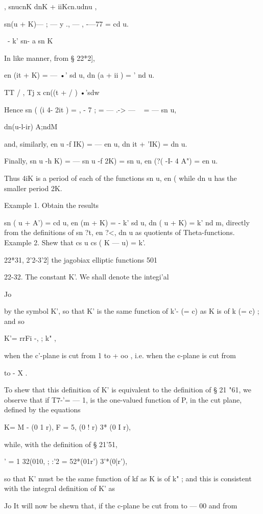  , snucnK dnK +  iiKcn.udnu , 

sn(u + K)— ; — y ., — , -—77 = cd u. 

  \ - k' sn- a sn  K 

In like manner, from § 22*2], 

en (it + K) = —  •' sd u, dn (a + ii ) =  ' nd u. 

TT / , Tj x cn((t + / )  •'sdw 

Hence sn ( (i 4- 2it ) = , -  7 ; = — .-> —  ~ = — sn u, 

  dn(u-l-ir) A;ndM 

and, similarly, en  u -f  IK) = — en u, dn  it + 'IK) = dn u. 

Finally, sn  u -h  K) = — sn  u -f 2K) = sn u, en (?( -I- 4 A") = en u. 

Thus 4iK is a period of each of the functions sn u, en (  while dn u has 
the smaller period 2K. 

Example 1. Obtain the results 

sn ( u + A') = cd u, en (m + K) = - k' sd u, dn ( u + K) = k' nd m, 
directly from the definitions of sn ?t, en ?<, dn u as quotients of Theta-functions. 
Example 2. Shew that cs u cs ( K — u) = k'. 



22*31, 2'2-3'2] the jagobiax elliptic functions 501 

22-32. The constant K'. 
We shall denote the integi'al 

Jo 

by the symbol K', so that K' is the same function of k'- (= c) as K is of 
k  (= c) ; and so 

K'= rrFi -, ; k"  , 

when the c'-plane is cut from 1 to + oo , i.e. when the c-plane is cut from 

to - X . 

To shew that this definition of K' is equivalent to the definition of § 21 "61, we observe 
that if T7-'= — 1,   is the one-valued function of P, in the cut plane, defined by the equations 

K= M - (0 1 r), F = 5,  (0 ! r)  3* (0 I r), 

while, with the definition of § 21'51, 

 ' = 1 32(010, ; :'2 = 52*(01r') 3'*(0|r'), 

so that K' must be the same function of kf  as K is of k"  ; and this is consistent with the 
integral definition of K' as 

Jo 
It will now be shewn that, if the c-plane be cut from to — 00 and from 


